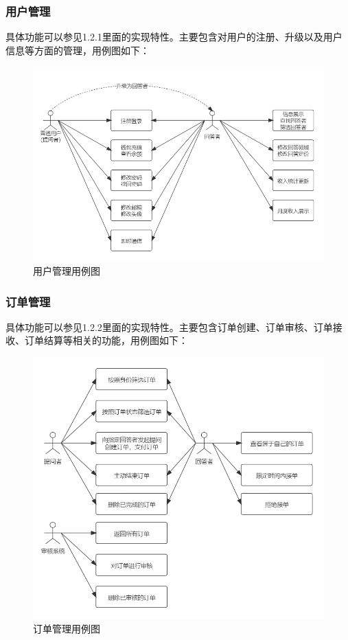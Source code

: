 \documentclass[12pt]{ctexart}
\begin{document}
\subsubsection{用户管理}
具体功能可以参见1.2.1里面的实现特性。主要包含对用户的注册、升级以及用户信息等方面的管理，用例图如下：
\begin{figure}[H]
	\includegraphics{1.png}\caption{用户管理用例图}
\end{figure}
\subsubsection{订单管理}
具体功能可以参见1.2.2里面的实现特性。主要包含订单创建、订单审核、订单接收、订单结算等相关的功能，用例图如下：
\begin{figure}[H]
	\includegraphics{3.png}\caption{订单管理用例图}
\end{figure}
\end{document}
